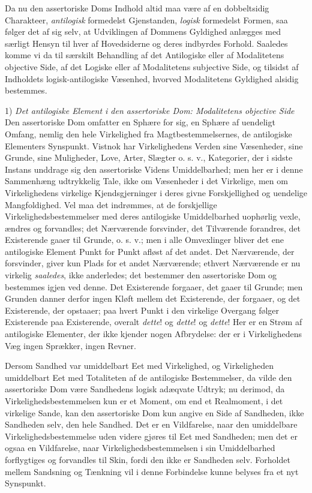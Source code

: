 \documentclass[12pt]{book}
\newcommand{\opage}[1]{\marginnote{\footnotesize\textit{[#1]}}}
\begin{document}
Da nu den assertoriske Doms Indhold altid maa være af
en dobbeltsidig Charakteer, \emph{antilogisk} formedelst Gjenstanden,
\emph{logisk} formedelst Formen, saa følger det af sig selv, at Udviklingen
af Dommens Gyldighed anlægges med særligt Hensyn
til hver af Hovedsiderne og deres indbyrdes Forhold.
Saaledes komme vi da til særskilt Behandling af det Antilogiske
eller af Modalitetens objective Side, af det Logiske
eller af Modalitetens subjective Side, og tilsidst af Indholdets
logisk-antilogiske Væsenhed, hvorved Modalitetens Gyldighed
alsidig bestemmes.

1) \emph{Det antilogiske Element i den assertoriske
Dom: Modalitetens objective Side}
Den assertoriske
Dom omfatter en Sphære for sig, en Sphære af uendeligt
Omfang, nemlig den hele Virkelighed fra Magtbestemmelsernes,
de antilogiske Elementers Synspunkt. Vistnok har Virkelighedens
Verden sine Væsenheder, sine Grunde, sine Muligheder,
Love, Arter, Slægter o. s. v., Kategorier, der i sidste
Instans unddrage sig den assertoriske Videns Umiddelbarhed;
men her er i denne Sammenhæng udtrykkelig Tale, ikke om
Væsenheder i det Virkelige, men om Virkelighedens virkelige
Kjendsgjerninger i deres givne Forskjellighed og uendelige
Mangfoldighed. Vel maa det indrømmes, at de forskjellige
Virkelighedsbestemmelser med deres antilogiske Umiddelbarhed
uophørlig vexle, ændres og forvandles; det Nærværende forsvinder,
det Tilværende forandres, det Existerende gaaer til
Grunde, o. s. v.; men i alle Omvexlinger bliver det ene
antilogiske Element Punkt for Punkt afløst af det andet. Det
Nærværende, der forsvinder, giver kun Plads for et andet
\opage{183}Nærværende; ethvert Nærværende er nu virkelig \emph{saaledes},
ikke anderledes; det bestemmer den assertoriske Dom og bestemmes
igjen ved denne. Det Existerende forgaaer, det
gaaer til Grunde; men Grunden danner derfor ingen Kløft
mellem det Existerende, der forgaaer, og det Existerende, der
opstaaer; paa hvert Punkt i den virkelige Overgang følger
Existerende paa Existerende, overalt \emph{dette}! og \emph{dette}! og
\emph{dette}! Her er en Strøm af antilogiske Elementer, der ikke
kjender nogen Afbrydelse: der er i Virkelighedens Væg ingen
Sprækker, ingen Revner.

Dersom Sandhed var umiddelbart Eet med Virkelighed,
og Virkeligheden umiddelbart Eet med Totaliteten af de antilogiske
Bestemmelser, da vilde den assertoriske Dom være
Sandhedens logisk adæqvate Udtryk; nu derimod, da Virkelighedsbestemmelsen
kun er et Moment, om end et Realmoment,
i det virkelige Sande, kan den assertoriske Dom kun angive
en Side af Sandheden, ikke Sandheden selv, den hele Sandhed.
Det er en Vildfarelse, naar den umiddelbare Virkelighedsbestemmelse
uden videre gjøres til Eet med Sandheden;
men det er ogsaa en Vildfarelse, naar Virkelighedsbestemmelsen
i sin Umiddelbarhed forflygtiges og forvandles til Skin, fordi
den ikke er Sandheden selv. Forholdet mellem Sandsning
og Tænkning vil i denne Forbindelse kunne belyses fra et nyt
Synspunkt.
\end{document}
